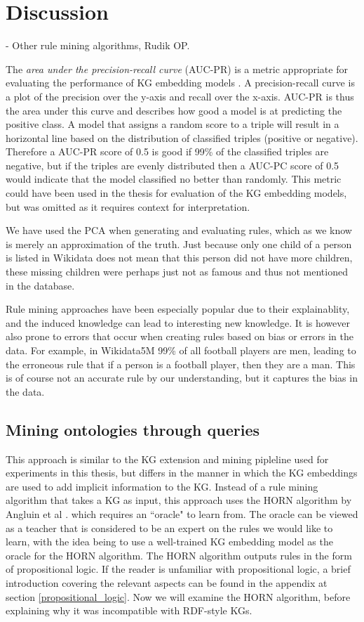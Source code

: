 \chapter{Discussion}

- Other rule mining algorithms, Rudik OP.

The \textit{area under the precision-recall curve} (AUC-PR) is a metric appropriate for evaluating the performance of KG embedding models \cite{jahn2021reasoning}. A precision-recall curve is a plot of the precision over the y-axis and recall over the x-axis. AUC-PR is thus the area under this curve and describes how good a model is at predicting the positive class. A model that assigns a random score to a triple will result in a horizontal line based on the distribution of classified triples (positive or negative). Therefore a AUC-PR score of 0.5 is good if 99\% of the classified triples are negative, but if the triples are evenly distributed then a AUC-PC score of 0.5 would indicate that the model classified no better than randomly. This metric could have been used in the thesis for evaluation of the KG embedding models, but was omitted as it requires context for interpretation.


We have used the PCA when generating and evaluating rules, which as we know is merely an approximation of the truth. Just because only one child of a person is listed in Wikidata does not mean that this person did not have more children, these missing children were perhaps just not as famous and thus not mentioned in the database.

Rule mining approaches have been especially popular due to their explainablity, and the induced knowledge can lead to interesting new knowledge. It is however also prone to errors that occur when creating rules based on bias or errors in the data. For example, in Wikidata5M 99\% of all football players are men, leading to the erroneous rule that if a person is a football player, then they are a man. This is of course not an accurate rule by our understanding, but it captures the bias in the data.


\section{Mining ontologies through queries}
This approach is similar to the KG extension and mining pipleline used for experiments in this thesis, but differs in the manner in which the KG embeddings are used to add implicit information to the KG. Instead of a rule mining algorithm that takes a KG as input, this approach uses the HORN algorithm by Angluin et al \cite{DBLP:journals/ml/AngluinFP92}. which requires an ``oracle" to learn from. The oracle can be viewed as a teacher that is considered to be an expert on the rules we would like to learn, with the idea being to use a well-trained KG embedding model as the oracle for the HORN algorithm. The HORN algorithm outputs rules in the form of propositional logic. If the reader is unfamiliar with propositional logic, a brief introduction covering the relevant aspects can be found in the appendix at section \ref{propositional_logic}. Now we will examine the HORN algorithm, before explaining why it was incompatible with RDF-style KGs.

